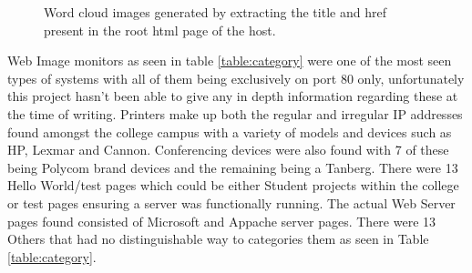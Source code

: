 \documentclass[a4wide,leqno,12pt]{report}
\begin{document}
\begin{figure}[H]
  \centering
  \hfill
  \hfill
  \hfill
  \caption{Word cloud images generated by extracting the title and href present in the root html page of the host.}
\end{figure}


Web Image monitors as seen in table \ref{table:category} were one of the most seen types of systems with all of them being exclusively on port 80 only, unfortunately this project hasn't been able to give any in depth information regarding these at the time of writing. Printers make up both the regular and irregular IP addresses found amongst the college campus with a variety of models and devices such as HP, Lexmar and Cannon. Conferencing devices were also found with 7 of these being Polycom brand devices\cite{polycom} and the remaining being a Tanberg. There were 13 Hello World/test pages which could be either Student projects within the college or test pages ensuring a server was functionally running. The actual Web Server pages  found consisted of Microsoft and Appache server pages. There were 13 Others that had no distinguishable way to categories them as seen in Table \ref{table:category}. 
\end{document}
